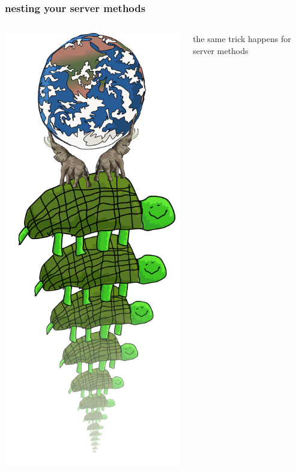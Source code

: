 \documentclass{beamer}
\begin{document}
\begin{frame}
    \frametitle{nesting your server methods}
    \begin{columns}[c]
        \includegraphics[scale=0.28]{images/all_the_way_down.png}
        \begin{center}
        \fbox{}
        \newline
        
        \huge
        the same trick happens for server methods
        
        \end{center}
    \end{columns}
\end{frame}
\end{document}
